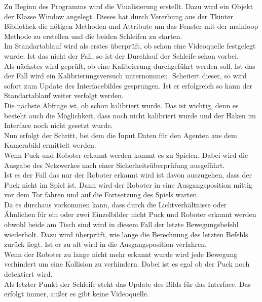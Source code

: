 Zu Beginn des Programms wird die Viualisierung erstellt. Dazu wird ein Objekt der Klasse Window angelegt. Dieses hat durch Vererbung aus der Tkinter Bibliothek die nötigen Methoden und Attribute um das Fenster mit der mainloop Methode zu erstellen und die beiden Schleifen zu starten. \\
Im Standartablauf wird als erstes überprüft, ob schon eine Videoquelle festgelegt wurde. Ist das nicht der Fall, so ist der Durchlauf der Schleife schon vorbei. \\
Als nächstes wird geprüft, ob eine Kalibrierung durchgeführt werden soll. Ist das der Fall wird ein Kalibrierungsversuch unternommen. Scheitert dieser, so wird sofort zum Update des Interfacebildes gesprungen. Ist er erfolgreich so kann der Standartablauf weiter verfolgt werden.\\
Die nächste Abfrage ist, ob schon kalibriert wurde. Das ist wichtig, denn es besteht auch die Möglichkeit, dass noch nicht kalibriert wurde und der Haken im Interface noch nicht gesetzt wurde.\\
Nun erfolgt der Schritt, bei dem die Input Daten für den Agenten aus dem Kamerabild ermittelt werden.\\
Wenn Puck und Roboter erkannt werden kommt es zu Spielen. Dabei wird die Ausgabe des Netzwerkes nach einer Sicherheitsüberprüfung ausgeführt.\\
Ist es der Fall das nur der Roboter erkannt wird ist davon auszugehen, dass der Puck nicht im Spiel ist. Dann wird der Roboter in eine Ausgangsposition mittig vor dem Tor fahren und auf die Fortsetzung des Spiels warten.\\
Da es durchaus vorkommen kann, dass durch die Lichtverhältnisse oder Ähnlichen für ein oder zwei Einzelbilder nicht Puck und Roboter erkannt werden obwohl beide am Tisch sind wird in diesem Fall der letzte Bewegungsbefehl wiederholt. Dazu wird überprüft, wie lange die Berechnung des letzten Befehls zurück liegt. Ist er zu alt wird in die Ausgangsposition verfahren.\\
Wenn der Roboter zu lange nicht mehr erkannt wurde wird jede Bewegung verhindert um eine Kollision zu verhindern. Dabei ist es egal ob der Puck noch detektiert wird.\\
Als letzter Punkt der Schleife steht das Update des Bilds für das Interface. Das erfolgt immer, außer es gibt keine Videoquelle.\\ 




